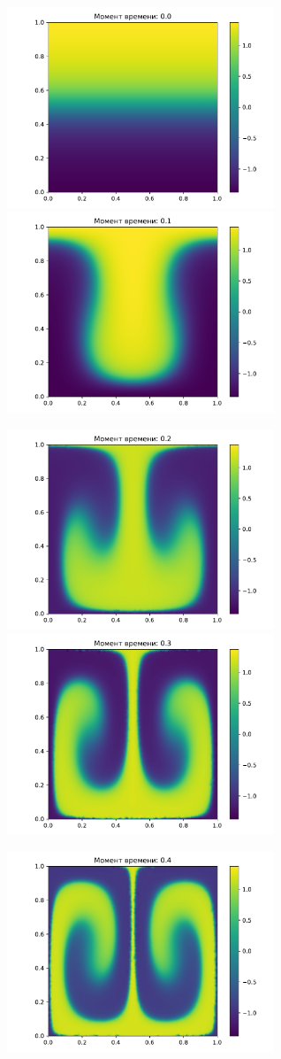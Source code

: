     \begin{figure}[H]
        \centering
        \includegraphics[width=8cm]{pictures/p0.pdf}
        \includegraphics[width=8cm]{pictures/p5.pdf}
    \end{figure}
    \begin{figure}[H]
        \centering
        \includegraphics[width=8cm]{pictures/p10.pdf}
        \includegraphics[width=8cm]{pictures/p15.pdf}
    \end{figure}
    \begin{figure}[H]
        \centering
        \includegraphics[width=8cm]{pictures/p20.pdf}
    \end{figure}

        